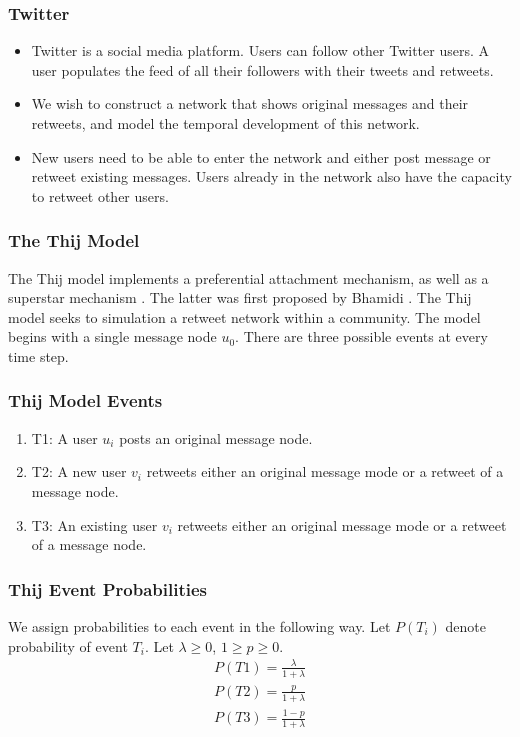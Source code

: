 \documentclass{beamer}
\begin{document}
\begin{frame}
\frametitle{Twitter}
    \begin{itemize}
        \item Twitter is a social media platform. Users can follow other Twitter users. A user populates the feed of all 
        their followers with their tweets and retweets. 
        \item We wish to construct a network that shows original messages and their retweets, and model the temporal development
        of this network.
        \item New users need to be able to enter the network and either post message or retweet existing messages. Users already 
        in the network also have the capacity to retweet other users.  
    \end{itemize}
\end{frame}


\begin{frame}
\frametitle{The Thij Model}
    The Thij model implements a preferential attachment mechanism, as well as a
    superstar mechanism \cite{thij}. The latter was first proposed by Bhamidi \cite{Bhamidi_2015}. 
    \vspace{3mm}
    The Thij model seeks to simulation a retweet network within a community. The model begins
    with a single message node $u_0$. There are three possible events at every time step.
\end{frame}

\begin{frame}
    \frametitle{Thij Model Events}
    \begin{enumerate}
        \item T1: A user $u_i$ posts an original message node.
        \item T2: A new user $v_i$ retweets either an original message mode or a retweet of a message node.
        \item T3: An existing user $v_i$ retweets either an original message mode or a retweet of a message node.
    \end{enumerate}
\end{frame}

\begin{frame}
    \frametitle{Thij Event Probabilities}
    We assign probabilities to each event in the following way. Let $P(T_i)$
    denote probability of event $T_i$. Let $\lambda \geq 0$, $1\geq p \geq 0$.
    \begin{align*}
        P(T1) = \frac{\lambda}{1 + \lambda}\\
        P(T2) = \frac{p}{1 + \lambda}\\
        P(T3) = \frac{1-p}{1 + \lambda}\\
    \end{align*}
\end{frame}
\end{document}

